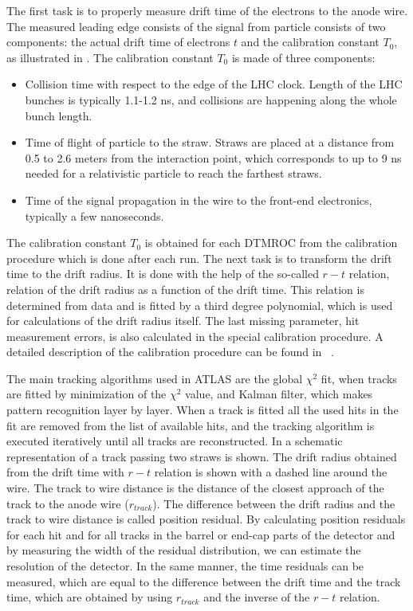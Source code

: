 The first task is to properly measure drift time of the electrons to the anode wire. 
The measured leading edge consists of the signal from particle 
consists of two components: the actual drift time of electrons $t$ and the calibration constant $T_{0}$, as illustrated in .
The calibration constant $T_{0}$ is made of three components:
\begin{itemize}
 \item Collision time with respect to the edge of the LHC clock. Length of the LHC bunches is typically 1.1-1.2 ns, and collisions are happening along the whole bunch length.\\ 
 \item Time of flight of particle to the straw. Straws are placed at a distance from 0.5 to 2.6 meters from the interaction point, 
 which corresponds to up to 9 ns needed for a relativistic particle to reach the farthest straws.
 \item Time of the signal propagation in the wire to the front-end electronics, typically a few nanoseconds.
\end{itemize}
The calibration constant $T_{0}$ is obtained for each DTMROC from the calibration procedure which is done after each run.
The next task is to transform the drift time to the drift radius. It is done with the help of the so-called $r-t$ relation, relation of the drift radius as a function of the drift time.
This relation is determined from data and is fitted by a third degree polynomial, which is used for calculations of the drift radius itself.
The last missing parameter, hit measurement errors, is also calculated in the special calibration procedure. A detailed description of the calibration procedure
can be found in ~\cite{alonso_thesis}.

The main tracking algorithms used in ATLAS are the global $\chi^2$ fit, when tracks are fitted by minimization of the $\chi^2$ value, and Kalman filter, which makes pattern recognition
layer by layer. When a track is fitted all the used hits in the fit are removed from the list of available hits, and the tracking algorithm is executed iteratively until all tracks are reconstructed.
In  a schematic representation of a track passing two straws is shown. The drift radius obtained from the drift time with $r-t$ relation is
shown with a dashed line around the wire. The track to wire distance is the distance of the closest approach of the track to the anode wire ($r_{track}$). The difference
between the drift radius and the track to wire distance is called position residual. By calculating position residuals for each hit and for all
tracks in the barrel or end-cap parts of the detector and by measuring the width of the residual distribution, we can estimate the resolution of the detector.
In the same manner, the time residuals can be measured, which are equal to the difference between the drift time and the track time, which are obtained by using $r_{track}$ and the inverse of the
$r-t$ relation.


